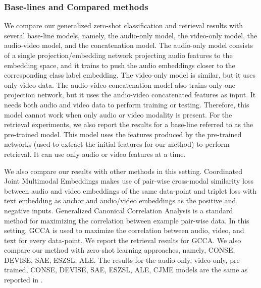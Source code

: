 \documentclass[10pt,twocolumn,letterpaper]{article}
\begin{document}
\subsubsection{Base-lines and Compared methods}
We compare our generalized zero-shot classification and retrieval results with several base-line models, namely, the audio-only model, the video-only model, the audio-video model,  and the concatenation model. The audio-only model consists of a single projection/embedding network projecting audio features to the embedding space, and it trains to push the audio embeddings closer to the corresponding class label embedding. The video-only model is similar, but it uses only video data. The audio-video concatenation model also trains only one projection network, but it uses the audio-video concatenated features as input. It needs both audio and video data to perform training or testing. Therefore, this model cannot work when only audio or video modality is present. For the retrieval experiments, we also report the results for a base-line referred to as the pre-trained model. This model uses the features produced by the pre-trained networks (used to extract the initial features for our method) to perform retrieval. It can use only audio or video features at a time.


We also compare our results with other methods in this setting. Coordinated Joint Multimodal Embeddings \cite{parida2020coordinated} makes use of pair-wise cross-modal similarity loss between audio and video embeddings of the same data-point and triplet loss with text embedding as anchor and audio/video embeddings as the positive and negative inputs. Generalized Canonical Correlation Analysis \cite{kettenring1971canonical} is a standard method for maximizing the correlation between example pair-wise data. In this setting, GCCA is used to maximize the correlation between audio, video, and text for every data-point. We report the retrieval results for GCCA. We also compare our method with zero-shot learning approaches, namely, CONSE, DEVISE, SAE, ESZSL, ALE. The results for the audio-only, video-only, pre-trained, CONSE, DEVISE, SAE, ESZSL, ALE, CJME models are the same as reported in \cite{parida2020coordinated}. 
\end{document}
